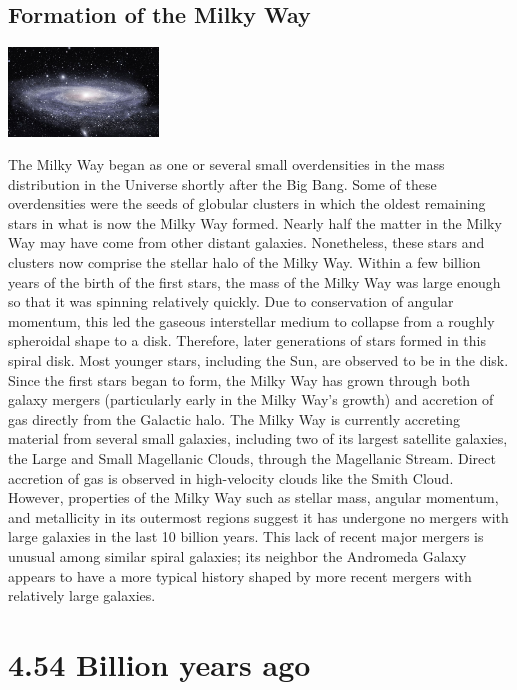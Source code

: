 \documentclass[11pt]{report}
\begin{document}
\section{Formation of the Milky Way}
\vspace{2mm}\begin{center}\includegraphics[width=4cm]{./img/milkyway.jpg}\end{center}
The Milky Way began as one or several small overdensities in the mass distribution in the Universe shortly after the Big Bang. Some of these overdensities were the seeds of globular clusters in which the oldest remaining stars in what is now the Milky Way formed. Nearly half the matter in the Milky Way may have come from other distant galaxies. Nonetheless, these stars and clusters now comprise the stellar halo of the Milky Way. Within a few billion years of the birth of the first stars, the mass of the Milky Way was large enough so that it was spinning relatively quickly. Due to conservation of angular momentum, this led the gaseous interstellar medium to collapse from a roughly spheroidal shape to a disk. Therefore, later generations of stars formed in this spiral disk. Most younger stars, including the Sun, are observed to be in the disk.\\
Since the first stars began to form, the Milky Way has grown through both galaxy mergers (particularly early in the Milky Way's growth) and accretion of gas directly from the Galactic halo. The Milky Way is currently accreting material from several small galaxies, including two of its largest satellite galaxies, the Large and Small Magellanic Clouds, through the Magellanic Stream. Direct accretion of gas is observed in high-velocity clouds like the Smith Cloud. However, properties of the Milky Way such as stellar mass, angular momentum, and metallicity in its outermost regions suggest it has undergone no mergers with large galaxies in the last 10 billion years. This lack of recent major mergers is unusual among similar spiral galaxies; its neighbor the Andromeda Galaxy appears to have a more typical history shaped by more recent mergers with relatively large galaxies.\\

\chapter{4.54 Billion years ago}
\end{document}
